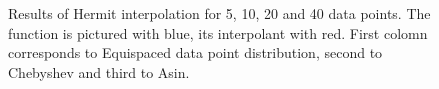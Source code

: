 \documentclass[10pt]{article}
\begin{document}
\begin{figure}[H]
\begin{minipage}[h]{0.34\linewidth}
		\end{minipage}%
		\begin{minipage}[h]{0.34\linewidth}
		\end{minipage}%
		\caption{Results of Hermit interpolation for 5, 10, 20 and 40 data points. The function is pictured with blue, its interpolant with red. First colomn corresponds to Equispaced data point distribution, second to Chebyshev and third to Asin.}
	\end{figure}
 \newpage
\end{document}
